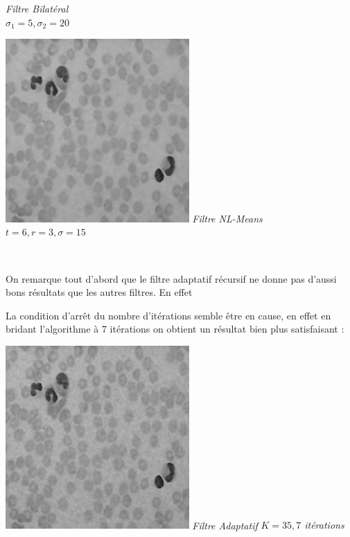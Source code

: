 \documentclass[a4,12pt]{article}
\begin{document}
\begin{center}
\begin{minipage}[c]{0.45\linewidth}
\begin{center}
			\textit{Filtre Bilatéral}\\
			\textit{$\sigma_1 =5 , \sigma_2=20$}\\
		\end{center}
	\end{minipage}
	\begin{minipage}[c]{0.45\linewidth}
		\begin{center}
			\includegraphics[width = 70mm]{./img/globNLMeans.jpg}
			\textit{Filtre NL-Means}\\
			\textit{$t = 6, r= 3, \sigma=15$}\\
		\end{center}
	\end{minipage}\\
\end{center}


On remarque tout d'abord que le filtre adaptatif récursif ne donne pas d'aussi bons résultats que les autres filtres. En effet 

La condition d'arrêt du nombre d'itérations semble être en cause, en effet en bridant l'algorithme à 7 itérations on obtient un résultat bien plus satisfaisant :\\

\noindent
\begin{center}
	\begin{minipage}[c]{0.45\linewidth}
		\begin{center}
			\includegraphics[width = 70mm]{./img/globAdaptMoinsInt.jpg}
			\textit{Filtre Adaptatif}
			\textit{$K = 35, 7$ itérations}\
		\end{center}
	\end{minipage}
\end{center}
\end{document}
